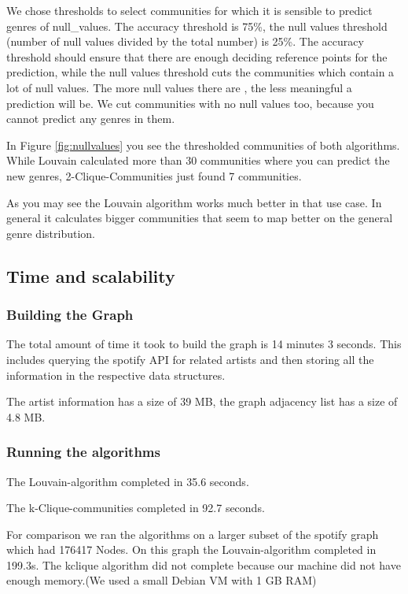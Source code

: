\documentclass[11pt,a4paper,onecolumn,notitlepage]{article}
\begin{document}
We chose thresholds to select communities for which it is sensible to predict genres of null\_values. The accuracy threshold is 75\%, the null values threshold (number of null values divided by the total number) is 25\%. The accuracy threshold should ensure that there are enough deciding reference points for the prediction, while the null values threshold cuts the communities which contain a lot of null values. The more null values there are , the less meaningful a prediction will be. We cut communities with no null values too, because you cannot predict any genres in them.

In Figure \ref{fig:nullvalues} you see the thresholded communities of both algorithms. While Louvain calculated more than 30 communities where you can predict the new genres, 2-Clique-Communities just found 7 communities.

As you may see the Louvain algorithm works much better in that use case. In general it calculates bigger communities that seem to map better on the general genre distribution.


\subsection{Time and scalability}

\subsubsection*{Building the Graph}

The total amount of time it took to build the graph is 14 minutes 3 seconds. This includes querying the spotify API for related artists and then storing all the information in the respective data structures.

The artist information has a size of 39 MB, the graph adjacency list has a size of 4.8 MB.

\subsubsection*{Running the algorithms}

The Louvain-algorithm completed in 35.6 seconds.

The k-Clique-communities completed in 92.7 seconds.

For comparison we ran the algorithms on a larger subset of the spotify graph which had 176417 Nodes. On this graph the Louvain-algorithm completed in 199.3s. The kclique algorithm did not complete because our machine did not have enough memory.(We used a small Debian VM with 1 GB RAM)
\end{document}
